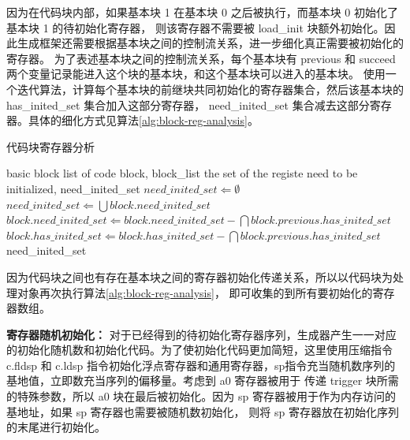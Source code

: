 因为在代码块内部，如果基本块 1 在基本块 0 之后被执行，而基本块 0 初始化了基本块 1 的待初始化寄存器，
则该寄存器不需要被 load\_init 块额外初始化。因此生成框架还需要根据基本块之间的控制流关系，进一步细化真正需要被初始化的寄存器。
为了表述基本块之间的控制流关系，每个基本块有 previous 和 succeed 两个变量记录能进入这个块的基本块，和这个基本块可以进入的基本块。
使用一个迭代算法，计算每个基本块的前继块共同初始化的寄存器集合，然后该基本块的 has\_inited\_set 集合加入这部分寄存器，
need\_inited\_set 集合减去这部分寄存器。具体的细化方式见算法\ref{alg:block-reg-analysis}。\par

\begin{algorithm}[!h]
    \caption{代码块寄存器分析}
    \label{alg:block-reg-analysis}
    \renewcommand{\algorithmicrequire}{\textbf{Input:}}
    \renewcommand{\algorithmicensure}{\textbf{Output:}}
    
    \begin{algorithmic}[1]
        \REQUIRE basic block list of code block, block\_list    %
        \ENSURE  the set of the registe need to be initialized, need\_inited\_set  %
        \STATE $need\_inited\_set \Leftarrow \emptyset$
            \STATE $need\_inited\_set \Leftarrow \bigcup block.need\_inited\_set$
                \STATE $block.need\_inited\_set \Leftarrow block.need\_inited\_set - \bigcap block.previous.has\_inited\_set$
                \STATE $block.has\_inited\_set \Leftarrow block.has\_inited\_set - \bigcap block.previous.has\_inited\_set$
            \ENDFOR
        \ENDWHILE
        \RETURN need\_inited\_set
    \end{algorithmic}
\end{algorithm}

因为代码块之间也有存在基本块之间的寄存器初始化传递关系，所以以代码块为处理对象再次执行算法\ref{alg:block-reg-analysis}，
即可收集的到所有要初始化的寄存器数组。\par

\textbf{寄存器随机初始化：}
对于已经得到的待初始化寄存器序列，生成器产生一一对应的初始化随机数和初始化代码。为了使初始化代码更加简短，这里使用压缩指令
c.fldsp 和 c.ldsp 指令初始化浮点寄存器和通用寄存器，sp指令充当随机数序列的基地值，立即数充当序列的偏移量。考虑到 a0 寄存器被用于
传递 trigger 块所需的特殊参数，所以 a0 块在最后被初始化。因为 sp 寄存器被用于作为内存访问的基地址，如果 sp 寄存器也需要被随机数初始化，
则将 sp 寄存器放在初始化序列的末尾进行初始化。\par


